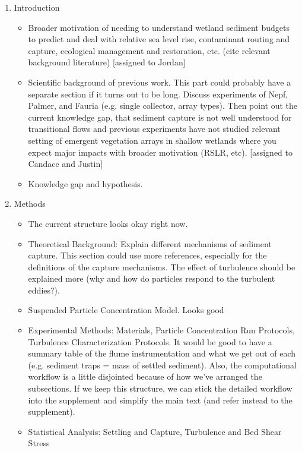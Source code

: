 \documentclass{scrreprt}
\begin{document}
\begin{enumerate}
    \item Introduction
    \begin{itemize}
        \item Broader motivation of needing to understand wetland sediment budgets to predict and deal with relative sea level rise, contaminant routing and capture, ecological management and restoration, etc. (cite relevant background literature) [assigned to Jordan]
        \item Scientific background of previous work. This part could probably have a separate section if it turns out to be long. Discuss experiments of Nepf, Palmer, and Fauria (e.g. single collector, array types). Then point out the current knowledge gap, that sediment capture is not well understood for transitional flows and previous experiments have not studied relevant setting of emergent vegetation arrays in shallow wetlands where you expect major impacts with broader motivation (RSLR, etc). [assigned to Candace and Justin]
        \item Knowledge gap and hypothesis.
    \end{itemize}
    
    \item Methods
    \begin{itemize}
        \item The current structure looks okay right now.
        \item Theoretical Background: Explain different mechanisms of sediment capture. This section could use more references, especially for the definitions of the capture mechanisms. The effect of turbulence should be explained more (why and how do particles respond to the turbulent eddies?).
        \item Suspended Particle Concentration Model. Looks good
        \item Experimental Methods: Materials, Particle Concentration Run Protocols, Turbulence Characterization Protocols. It would be good to have a summary table of the flume instrumentation and what we get out of each (e.g. sediment traps = mass of settled sediment). Also, the computational workflow is a little disjointed because of how we've arranged the subsections. If we keep this structure, we can stick the detailed workflow into the supplement and simplify the main text (and refer instead to the supplement).
        \item Statistical Analysis: Settling and Capture, Turbulence and Bed Shear Stress
    \end{itemize}
    

\end{enumerate}
\end{document}
